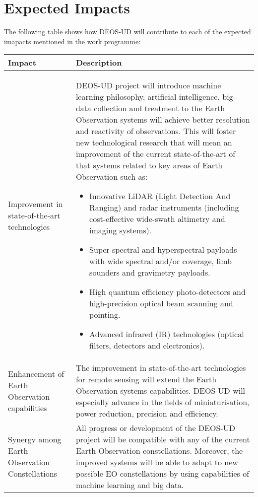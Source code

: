 \section{Expected Impacts}

The following table shows how DEOS-UD will contribute to each of the expected imapacts mentioned in the work programme:

\begin{longtable}{>{\raggedright\arraybackslash}p{3cm} p{11cm}}
	
	\toprule[2pt]
	
	\textbf{Impact} &  \textbf{Description}\\
	
	\midrule [1.5pt]
	\endhead
	
	Improvement in state-of-the-art technologies & DEOS-UD project will introduce machine learning philosophy, artificial intelligence, big-data collection and treatment to the Earth Observation systems will achieve better resolution and reactivity of observations. This will foster new technological research that will mean an improvement of the current state-of-the-art of that systems related to key areas of Earth Observation such as: 
	\begin{itemize}  
		\item Innovative LiDAR (Light Detection And Ranging) and radar instruments (including cost-effective wide-swath altimetry and imaging systems).
		\item Super-spectral and hyperspectral payloads with wide spectral and/or coverage, limb sounders and gravimetry payloads.
		\item High quantum efficiency photo-detectors and high-precision optical beam scanning and pointing.
		\item Advanced infrared (IR) technologies (optical filters, detectors and electronics).
	\end{itemize}\\
	
	\midrule
	
	Enhancement of Earth Observation capabilities & The improvement in state-of-the-art technologies for remote sensing will extend the Earth Observation systems capabilities. DEOS-UD will especially advance in the fields of miniaturisation, power reduction, precision and efficiency.\vspace{0.2cm}\\
	
	\midrule
	
	Synergy among Earth Observation Constellations & All progress or development of the DEOS-UD project will be compatible with any of the current Earth Observation constellations. Moreover, the improved systems will be able to adapt to new possible EO constellations by using capabilities of machine learning and big data.\vspace{0.2cm}\\
	

\end{longtable}
